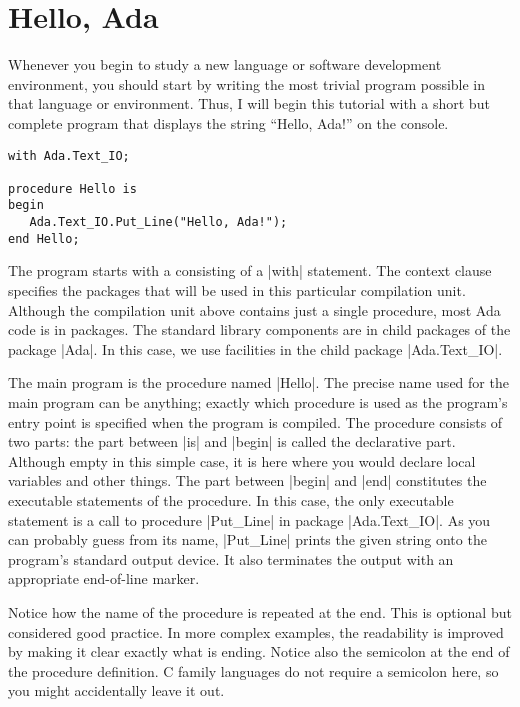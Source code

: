 \section{Hello, Ada}
\label{sec:hello-ada}

Whenever you begin to study a new language or software development environment, you should start
by writing the most trivial program possible in that language or environment. Thus, I will begin
this tutorial with a short but complete program that displays the string ``Hello, Ada!'' on the
console.

\label{lst:hello-ada}
\begin{lstlisting}
with Ada.Text_IO;

procedure Hello is
begin
   Ada.Text_IO.Put_Line("Hello, Ada!");
end Hello;
\end{lstlisting}

\noindent The program starts with a  consisting of a |with| statement.
The context clause specifies the packages that will be used in this particular compilation unit.
Although the compilation unit above contains just a single procedure, most Ada code is in
packages. The standard library components are in child packages of the package |Ada|. In this
case, we use facilities in the child package |Ada.Text_IO|.

The main program is the procedure named |Hello|. The precise name used for the main program can
be anything; exactly which procedure is used as the program's entry point is specified when the
program is compiled. The procedure consists of two parts: the part between |is| and |begin| is
called the declarative part. Although empty in this simple case, it is here where you would
declare local variables and other things. The part between |begin| and |end| constitutes the
executable statements of the procedure. In this case, the only executable statement is a call to
procedure |Put_Line| in package |Ada.Text_IO|. As you can probably guess from its name,
|Put_Line| prints the given string onto the program's standard output device. It also terminates
the output with an appropriate end-of-line marker.

Notice how the name of the procedure is repeated at the end. This is optional but considered
good practice. In more complex examples, the readability is improved by making it clear exactly
what is ending. Notice also the semicolon at the end of the procedure definition. C family
languages do not require a semicolon here, so you might accidentally leave it out.

